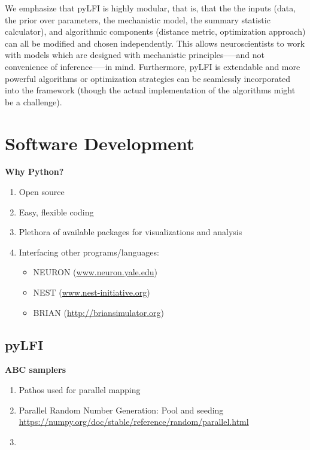 We emphasize that pyLFI is highly modular, that is, that the the inputs (data, the prior over parameters, the mechanistic model, the summary statistic calculator), and algorithmic components (distance metric, optimization approach) can all be modified and chosen independently. This allows neuroscientists to work with models which are designed with mechanistic principles–—and not convenience of inference–—in mind.
Furthermore, pyLFI is extendable and more powerful algorithms or optimization strategies can be seamlessly incorporated into the framework (though the actual implementation of the algorithms might be a challenge).



\section{Software Development}

\textbf{Why Python?}

\begin{enumerate}
    \item Open source
    \item Easy, flexible coding
    \item Plethora of available packages for visualizations and analysis
    \item Interfacing other programs/languages:
    \begin{itemize}
        \item NEURON (\url{www.neuron.yale.edu})
        \item NEST (\url{www.nest-initiative.org})
        \item BRIAN (\url{http://briansimulator.org})
    \end{itemize}
\end{enumerate}


\subsection{pyLFI}

\textbf{ABC samplers} 

\begin{enumerate}
    \item Pathos used for parallel mapping
    \item Parallel Random Number Generation: Pool and seeding \url{https://numpy.org/doc/stable/reference/random/parallel.html} 
    \item 
\end{enumerate}

